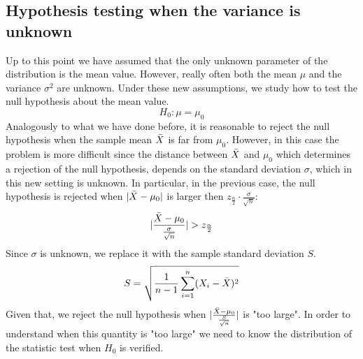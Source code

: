 \subsection{Hypothesis testing when the variance is unknown}
Up to this point we have assumed that the only unknown parameter of the distribution is the mean value. However, really often both the mean $\mu$ and the variance $\sigma^2$ are unknown. Under these new assumptions, we study how to test the null hypothesis about the mean value.
$$H_0 : \mu = \mu_0$$
Analogously to what we have done before, it is reasonable to reject the null hypothesis when the sample mean $\Bar{X}$ is far from $\mu_0$. However, in this case the problem is more difficult since the distance between $\Bar{X}$ and $\mu_0$ which determines a rejection of the null hypothesis, depends on the standard deviation $\sigma$, which in this new setting is unknown. In particular, in the previous case, the null hypothesis is rejected when $|\Bar{X}-\mu_0|$ is larger then $z_{\frac{\alpha}{2}} \cdot \frac{\sigma}{\sqrt{n}}$:
$$|\frac{\Bar{X}-\mu_0}{\frac{\sigma}{\sqrt{n}}}|>z_{\frac{\alpha}{2}}$$
Since $\sigma$ is unknown, we replace it with the sample standard deviation $S$.
\begin{equation}
    S = \sqrt{\frac{1}{n-1} \sum_{i=1}^n(X_i-\Bar{X})^2}
\end{equation}
Given that, we reject the null hypothesis when $|\frac{\Bar{X}-\mu_0}{\frac{S}{\sqrt{n}}}|$ is "too large". In order to understand when this quantity is "too large" we need to know the distribution of the statistic test when $H_0$ is verified.


